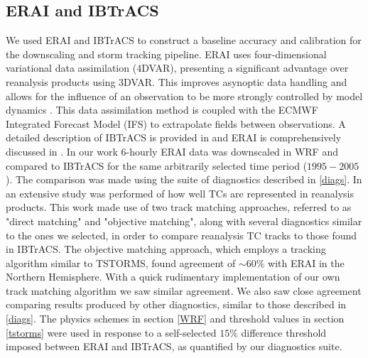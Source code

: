\subsection{ERAI and IBTrACS}
\label{erai}
We used ERAI and IBTrACS to construct a baseline accuracy and calibration for the downscaling and storm tracking pipeline. ERAI uses four-dimensional variational data assimilation (4DVAR), presenting a significant advantage over reanalysis products using 3DVAR. This improves asynoptic data handling and allows for the influence of an observation to be more strongly controlled by model dynamics \cite{tc_reanal:2}. This data assimilation method is coupled with the ECMWF Integrated Forecast Model (IFS) to extrapolate fields between observations. A detailed description of IBTrACS is provided in \cite{ibtracs} and ERAI is comprehensively discussed in \cite{erai_reanal}. In our work $6$-hourly ERAI data was downscaled in WRF and compared to IBTrACS for the same arbitrarily selected time period ($1995-2005$). The comparison was made using the suite of diagnostics described in \ref{diags}. In \cite{tc_reanal:1} an extensive study was performed of how well TCs are represented in reanalysis products. This work made use of two track matching approaches, referred to as "direct matching" and "objective matching", along with several diagnostics similar to the ones we selected, in order to compare reanalysis TC tracks to those found in IBTrACS. The objective matching approach, which employs a tracking algorithm similar to TSTORMS, found agreement of $\sim60\%$ with ERAI in the Northern Hemisphere. With a quick rudimentary implementation of our own track matching algorithm we saw similar agreement. We also saw close agreement comparing results produced by other diagnostics, similar to those described in \ref{diags}. The physics schemes in section \ref{WRF} and threshold values in section \ref{tstorms} were used in response to a self-selected $15\%$ difference threshold imposed between ERAI and IBTrACS, as quantified by our diagnostics suite.      

